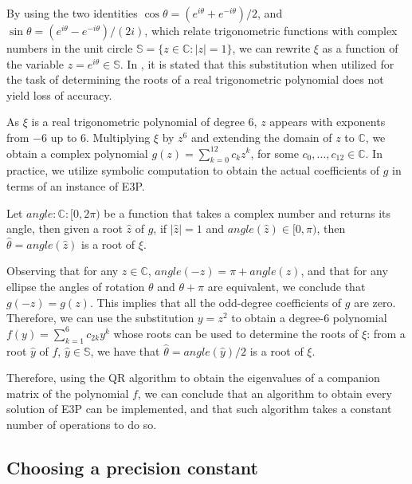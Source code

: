 By using the two identities $\cos{\theta} = (e^{i\theta} + e^{-i\theta})/2$, and $\sin{\theta} = (e^{i\theta} - e^{-i\theta})/(2i)$, which relate trigonometric functions with complex numbers in the unit circle $\mathbb{S}=\{z\in \mathbb{C}\colon |z|=1\}$, we can rewrite $\xi$ as a function of the variable $z=e^{i\theta}\in\mathbb{S}$. In \cite{weidner}, it is stated that this substitution when utilized for the task of determining the roots of a real trigonometric polynomial does not yield loss of accuracy.

As $\xi$ is a real trigonometric polynomial of degree $6$, $z$ appears with exponents from $-6$ up to $6$. Multiplying $\xi$ by $z^6$ and extending the domain of $z$ to $\mathbb{C}$, we obtain a complex polynomial $g(z)=\sum_{k=0}^{12} c_k z^k$, for some $c_0, \dots, c_{12} \in \mathbb{C}$. In practice, we utilize symbolic computation to obtain the actual coefficients of $g$ in terms of an instance of E3P.

Let $angle \colon \mathbb{C} \colon [0, 2\pi)$ be a function that takes a complex number and returns its angle, then given a root $\hat{z}$ of $g$, if $|\hat{z}|=1$ and $angle(\hat{z}) \in [0, \pi)$, then $\hat{\theta} = angle(\hat{z})$ is a root of $\xi$. 

Observing that for any $z\in \mathbb{C}$, $angle(-z)=\pi+angle(z)$, and that for any ellipse the angles of rotation $\theta$ and $\theta + \pi$ are equivalent, we conclude that $g(-z)=g(z)$. This implies that all the odd-degree coefficients of $g$ are zero. Therefore, we can use the substitution $y=z^2$ to obtain a degree-$6$ polynomial $f(y)=\sum_{k=1}^6 c_{2k} y^k$ whose roots can be used to determine the roots of $\xi$: from a root $\hat{y}$ of $f$, $\hat{y}\in\mathbb{S}$, we have that $\hat{\theta}=angle(\hat{y})/2$ is a root of $\xi$.

Therefore, using the QR algorithm to obtain the eigenvalues of a companion matrix of the polynomial $f$, we can conclude that an algorithm to obtain every solution of E3P can be implemented, and that such algorithm takes a constant number of operations to do so.


\subsection{Choosing a precision constant}

